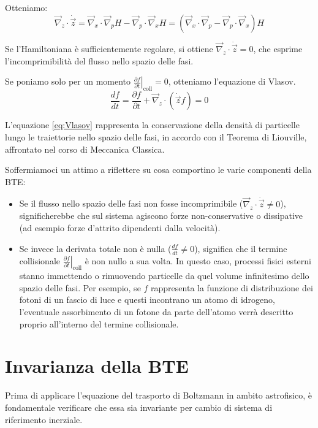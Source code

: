 \documentclass[11pt, a4paper, oneside]{scrreprt}
\begin{document}
Otteniamo:
\begin{equation}
    \vec{\nabla}_{z} \cdot \dot{\vec{z}} = \vec{\nabla}_{x} \cdot \vec{\nabla}_{p}H - \vec{\nabla}_{p} \cdot \vec{\nabla}_{x}H = (\vec{\nabla}_{x} \cdot \vec{\nabla}_{p} - \vec{\nabla}_{p} \cdot \vec{\nabla}_{x})H
\end{equation}

Se l'Hamiltoniana è sufficientemente regolare, si ottiene $\vec{\nabla}_{z} \cdot \dot{\vec{z}} = 0$, che esprime l'incomprimibilità del flusso nello spazio delle fasi.

Se poniamo solo per un momento $\left. \frac{\partial f}{\partial t} \right|_{\text{coll}} = 0$, otteniamo l'equazione di Vlasov.
\begin{equation} \label{eq:Vlasov}
    \frac{df}{dt} = \frac{\partial f}{\partial t} + \vec{\nabla}_{z} \cdot (\dot{\vec{z}}f) = 0
\end{equation}

L'equazione \eqref{eq:Vlasov} rappresenta la conservazione della densità di particelle lungo le traiettorie nello spazio delle fasi,
in accordo con il Teorema di Liouville, affrontato nel corso di Meccanica Classica.

Soffermiamoci un attimo a riflettere su cosa comportino le varie componenti della BTE:
\begin{itemize}
    \item Se il flusso nello spazio delle fasi non fosse incomprimibile ($\vec{\nabla}_{z} \cdot \dot{\vec{z}} \neq 0$), significherebbe che sul sistema agiscono forze non-conservative o dissipative (ad esempio forze d'attrito dipendenti dalla velocità).
    \item Se invece la derivata totale non è nulla ($\frac{df}{dt} \neq 0$), significa che il termine collisionale $\left. \frac{\partial f}{\partial t} \right|_{\text{coll}}$ è non nullo a sua volta. In questo caso, processi fisici esterni stanno immettendo o rimuovendo particelle da quel volume infinitesimo dello spazio delle fasi.
    Per esempio, se $f$ rappresenta la funzione di distribuzione dei fotoni di un fascio di luce e questi incontrano un atomo di idrogeno, l'eventuale assorbimento di un fotone da parte dell'atomo verrà descritto proprio all'interno del termine collisionale.
\end{itemize}

\section{Invarianza della BTE}
Prima di applicare l'equazione del trasporto di Boltzmann in ambito astrofisico, è fondamentale verificare che essa sia invariante per cambio di sistema di riferimento inerziale.
\end{document}
